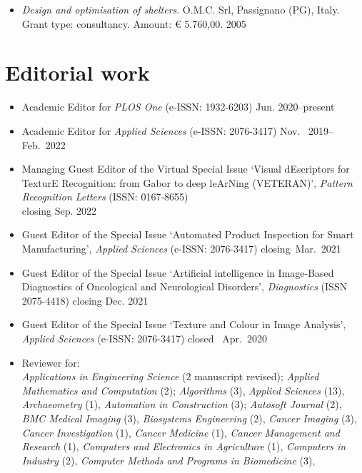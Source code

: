\documentclass[11pt]{article}
\begin{document}
\begin{itemize}
	\item \emph{Design and optimisation of shelters}. O.M.C. Srl, Passignano (PG), Italy. Grant type: consultancy. Amount: € 5.760,00. \hfill 2005
\end{itemize}

\section*{Editorial work}

\begin{itemize}
	\item Academic Editor for \emph{PLOS One} (e-ISSN: 1932-6203) \hfill Jun. 2020--present
	\item Academic Editor for \emph{Applied Sciences} (e-ISSN: 2076-3417) \hfill Nov.~ 2019--Feb.~2022
		\item Managing Guest Editor of the Virtual Special Issue `Visual dEscriptors for TexturE Recognition: from Gabor to deep leArNing (VETERAN)', \emph{Pattern Recognition Letters} (ISSN: 0167-8655) \\ \mbox{} \hfill closing Sep. 2022
	\item Guest Editor of the Special Issue `Automated Product Inspection for Smart Manufacturing', \emph{Applied Sciences} (e-ISSN: 2076-3417) \hfill closing~Mar.~2021
	\item Guest Editor of the Special Issue `Artificial intelligence in Image-Based Diagnostics of Oncological and Neurological Disorders', \emph{Diagnostics} (ISSN 2075-4418) \hfill closing Dec. 2021
	\item Guest Editor of the Special Issue `Texture and Colour in Image Analysis', \emph{Applied Sciences} (e-ISSN: 2076-3417) \hfill closed~ Apr.~2020
	\item Reviewer for: \\
		\emph{Applications in Engineering Science} (2 manuscript revised);
    \emph{Applied Mathematics and Computation} (2);
    \emph{Algorithms} (3),
    \emph{Applied Sciences} (13),
    \emph{Archaeometry} (1),
    \emph{Automation in Construction} (3);
    \emph{Autosoft Journal} (2),
    \emph{BMC Medical Imaging} (3),
    \emph{Biosystems Engineering} (2),
    \emph{Cancer Imaging} (3),
    \emph{Cancer Investigation} (1),
    \emph{Cancer Medicine} (1),
    \emph{Cancer Management and Research} (1),
    \emph{Computers and Electronics in Agriculture} (1),
    \emph{Computers in Industry} (2),
    \emph{Computer Methods and Programs in Biomedicine} (3),

\end{itemize}
\end{document}
